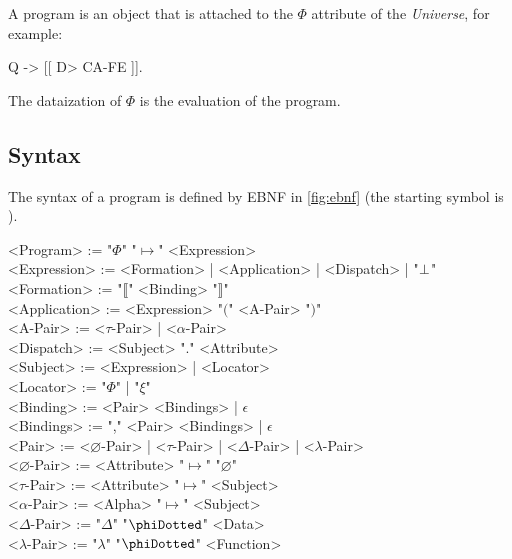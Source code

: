 A program is an object that is attached to the \(\Phi\) attribute
of the \emph{Universe}, for example:
\begin{phiquation*}
Q -> [[ D> CA-FE ]].
\end{phiquation*}
The dataization of \(\Phi\) is the evaluation of the program.

\subsection{Syntax}\label{sec:syntax}

The syntax of a program is defined by EBNF in \cref{fig:ebnf} (the starting symbol is ).

\begin{figure*}
\begin{mdframed}
\raggedright
\begin{ebnf}[8em]
<Program> := "\(\Phi\)" "\(\mapsto\)" <Expression> \\
<Expression> := <Formation> | <Application> | <Dispatch> | "\(\bot\)" \\
<Formation> := "\(\llbracket\)" <Binding> "\(\rrbracket\)" \\
<Application> := <Expression> "\(\lparen\)" <A-Pair> "\(\rparen\)" \\
<A-Pair> := <\(\tau\)-Pair> | <\(\alpha\)-Pair> \\
<Dispatch> := <Subject> "." <Attribute> \\
<Subject> := <Expression> | <Locator> \\
<Locator> := "\(\Phi\)" | "\(\xi\)" \\
<Binding> := <Pair> <Bindings> | \(\epsilon\) \\
<Bindings> := "," <Pair> <Bindings> | \(\epsilon\) \\
<Pair> := <\(\varnothing\)-Pair> | <\(\tau\)-Pair> | <\(\Delta\)-Pair> | <\(\lambda\)-Pair> \\
<\(\varnothing\)-Pair> := <Attribute> "\(\mapsto\)" "\(\varnothing\)" \\
<\(\tau\)-Pair> := <Attribute> "\(\mapsto\)" <Subject> \\
<\(\alpha\)-Pair> := <Alpha> "\(\mapsto\)" <Subject> \\
<\(\Delta\)-Pair> := "\(\Delta\)" "\(\phiDotted\)" <Data> \\
<\(\lambda\)-Pair> := "\(\lambda\)" "\(\phiDotted\)" <Function> \\
\end{ebnf}
\end{mdframed}
\caption{Syntax as a context-free grammar, in EBNF.}
\label{fig:ebnf}
\end{figure*}


